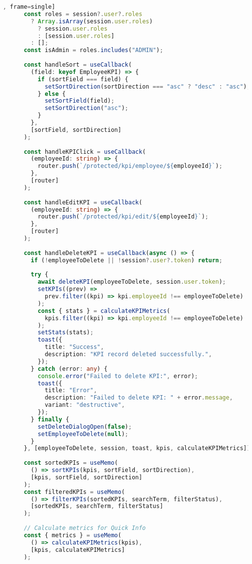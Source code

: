 \begin{lstlisting}[language=Typescript, caption=src/app/protected/kpi/page.tsx [front-end], frame=single]
      const roles = session?.user?.roles
        ? Array.isArray(session.user.roles)
          ? session.user.roles
          : [session.user.roles]
        : [];
      const isAdmin = roles.includes("ADMIN");
    
      const handleSort = useCallback(
        (field: keyof EmployeeKPI) => {
          if (sortField === field) {
            setSortDirection(sortDirection === "asc" ? "desc" : "asc");
          } else {
            setSortField(field);
            setSortDirection("asc");
          }
        },
        [sortField, sortDirection]
      );
    
      const handleKPIClick = useCallback(
        (employeeId: string) => {
          router.push(`/protected/kpi/employee/${employeeId}`);
        },
        [router]
      );
    
      const handleEditKPI = useCallback(
        (employeeId: string) => {
          router.push(`/protected/kpi/edit/${employeeId}`);
        },
        [router]
      );
    
      const handleDeleteKPI = useCallback(async () => {
        if (!employeeToDelete || !session?.user?.token) return;
    
        try {
          await deleteKPI(employeeToDelete, session.user.token);
          setKPIs((prev) =>
            prev.filter((kpi) => kpi.employeeId !== employeeToDelete)
          );
          const { stats } = calculateKPIMetrics(
            kpis.filter((kpi) => kpi.employeeId !== employeeToDelete)
          );
          setStats(stats);
          toast({
            title: "Success",
            description: "KPI record deleted successfully.",
          });
        } catch (error: any) {
          console.error("Failed to delete KPI:", error);
          toast({
            title: "Error",
            description: "Failed to delete KPI: " + error.message,
            variant: "destructive",
          });
        } finally {
          setDeleteDialogOpen(false);
          setEmployeeToDelete(null);
        }
      }, [employeeToDelete, session, toast, kpis, calculateKPIMetrics]);
    
      const sortedKPIs = useMemo(
        () => sortKPIs(kpis, sortField, sortDirection),
        [kpis, sortField, sortDirection]
      );
      const filteredKPIs = useMemo(
        () => filterKPIs(sortedKPIs, searchTerm, filterStatus),
        [sortedKPIs, searchTerm, filterStatus]
      );
    
      // Calculate metrics for Quick Info
      const { metrics } = useMemo(
        () => calculateKPIMetrics(kpis),
        [kpis, calculateKPIMetrics]
      );
    

\end{lstlisting}
